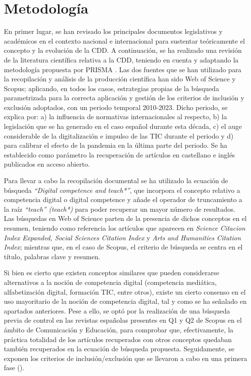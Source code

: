 \documentclass[spanish]{textolivre}
\begin{document}
\section{Metodología}\label{sec-2}
En primer lugar, se han revisado los principales documentos legislativos y académicos en el contexto nacional e internacional para sustentar teóricamente el concepto y la evolución de la CDD. A continuación, se ha realizado una revisión de la literatura científica relativa a la CDD, teniendo en cuenta y adaptando la metodología propuesta por PRISMA \cite{aguaded2022, fuentecobo2018, georgereyes2021, peters2022}. Las dos fuentes que se han utilizado para la recopilación y análisis de la producción científica han sido Web of Science y Scopus; aplicando, en todos los casos, estrategias propias de la búsqueda parametrizada para la correcta aplicación y gestión de los criterios de inclusión y exclusión adoptados, con un periodo temporal 2010-2023. Dicho periodo, se explica por: a) la influencia de normativas internacionales al respecto, b) la legislación que se ha generado en el caso español durante esta década, c) el auge considerable de la digitalización e impulso de las TIC durante el periodo y d) para calibrar el efecto de la pandemia en la última parte del periodo. Se ha establecido como parámetro la recuperación de artículos en castellano e inglés publicados en acceso abierto.  

Para llevar a cabo la recopilación documental se ha utilizado la ecuación de búsqueda \textit{“Digital competence and teach*”}, que incorpora el concepto relativo a competencia digital o digital competence y añade el operador de truncamiento a la raíz \textit{“teach” (teach*)} para poder recuperar un mayor número de resultados. Las búsquedas en Web of Science parten de la presencia de dichos conceptos en el resumen, teniendo como referencia los artículos que aparecen en \textit{Science Citacion Index Expanded, Social Sciences Citation Index} y \textit{Arts and Humanities Citation Index}; mientras que, en el caso de Scopus, el criterio de búsqueda se centra en el título, palabras clave y resumen.

Si bien es cierto que existen conceptos similares que pueden considerarse alternativos a la noción de competencia digital (competencia mediática, alfabetización digital, formación TIC, entre otros), existe un cierto consenso en el uso mayoritario de la noción de competencia digital, tal y como se ha señalado en apartados anteriores. Pese a ello, se optó por la realización de una búsqueda previa de control en las revistas españolas presentes en Q1 y Q2 de Scopus en el ámbito de Comunicación y Educación, para comprobar que, efectivamente, la práctica totalidad de los artículos recuperados con otros conceptos quedaban también recuperados en la ecuación de búsqueda propuesta. Seguidamente, se exponen los criterios de inclusión/exclusión que se llevaron a cabo en una primera fase ().
\end{document}
